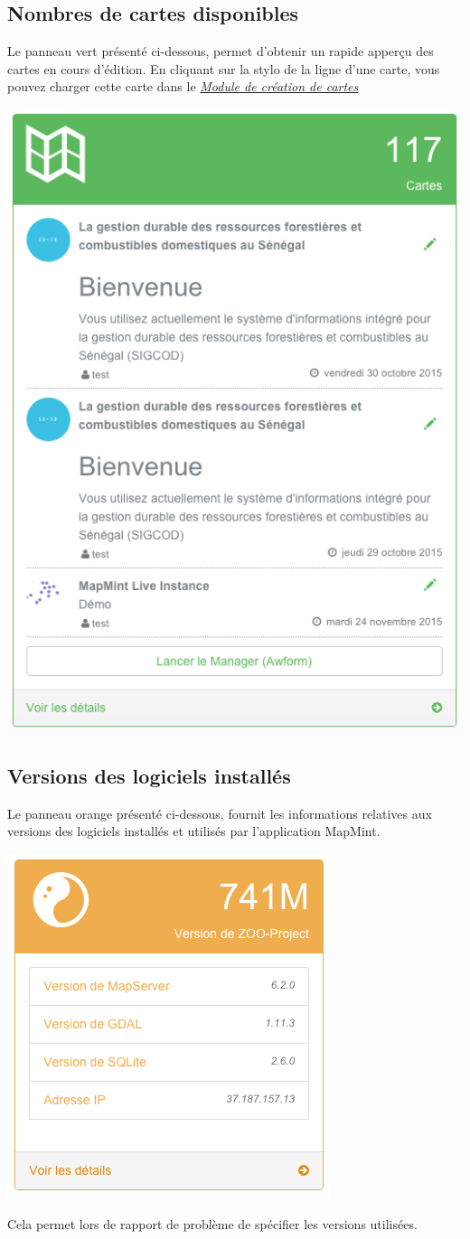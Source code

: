 \documentclass[letterpaper,10pt,french]{sphinxmanual}
\begin{document}
\subsection{Nombres de cartes disponibles}
\label{dashboard/overview:nombres-de-cartes-disponibles}
Le panneau vert présenté ci-dessous, permet d'obtenir un rapide
apperçu des cartes en cours d'édition. En cliquant sur la stylo de la
ligne d'une carte, vous pouvez charger cette carte dans le {\hyperref[maps/index::doc]{\emph{\emph{Module de création de cartes}}}}

\includegraphics[width=0.330\linewidth]{dashboard-manager-block.png}


\subsection{Versions des logiciels installés}
\label{dashboard/overview:versions-des-logiciels-installes}
Le panneau orange présenté ci-dessous, fournit les informations
relatives aux versions des logiciels installés et utilisés par
l'application MapMint.

\includegraphics[width=0.330\linewidth]{dashboard-version-block.png}

Cela permet lors de rapport de problème de spécifier les versions utilisées.
\end{document}
